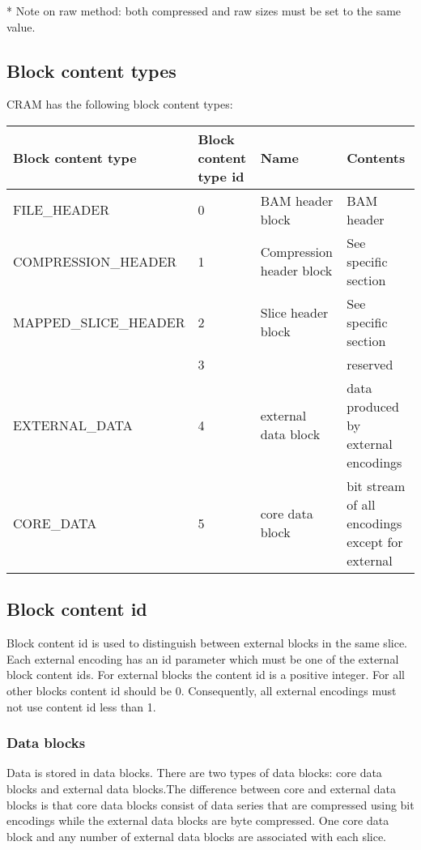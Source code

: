\documentclass[a4paper]{article}
\begin{document}
* Note on raw method: both compressed and raw sizes must be set to the same value.

\subsection{\textbf{Block content types}}

CRAM has the following block content types:

\begin{tabular}{|>{\raggedright}p{143pt}|>{\raggedright}p{45pt}|>{\raggedright}p{116pt}|>{\raggedright}p{114pt}|}
\hline
\textbf{Block content type} & \textbf{Block content type id} & \textbf{Name} & \textbf{Contents}\tabularnewline
\hline
FILE\_HEADER & 0 & BAM header block & BAM header\tabularnewline
\hline
COMPRESSION\_HEADER & 1 & Compression header block & See specific section\tabularnewline
\hline
MAPPED\_SLICE\_HEADER & 2 & Slice header block & See specific section\tabularnewline
\hline
 & 3 &  & reserved\tabularnewline
\hline
EXTERNAL\_DATA & 4 & external data block & data produced by external encodings\tabularnewline
\hline
CORE\_DATA & 5 & core data block & bit stream of all encodings except for external\tabularnewline
\hline
\end{tabular}


\subsection{\textbf{Block content id}}

Block content id is used to distinguish between external blocks in the same slice. 
Each external encoding has an id parameter which must be one of the external block 
content ids. For external blocks the content id is a positive integer. For all 
other blocks content id should be 0. Consequently, all external encodings must 
not use content id less than 1. 

\subsubsection*{Data blocks}

Data is stored in data blocks. There are two types of data blocks: core data blocks 
and external data blocks.The difference between core and external data blocks is 
that core data blocks consist of data series that are compressed using bit encodings 
while the external data blocks are byte compressed. One core data block and any 
number of external data blocks are associated with each slice.
\end{document}
